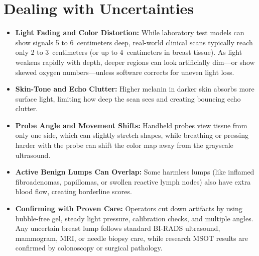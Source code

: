 \section{Dealing with Uncertainties}
\begin{itemize}
  \item \textbf{Light Fading and Color Distortion:} While laboratory test models can show signals 5 to 6~centimeters deep, real-world clinical scans typically reach only 2 to 3~centimeters (or up to 4~centimeters in breast tissue). As light weakens rapidly with depth, deeper regions can look artificially dim---or show skewed oxygen numbers---unless software corrects for uneven light loss.
  \item \textbf{Skin-Tone and Echo Clutter:} Higher melanin in darker skin absorbs more surface light, limiting how deep the scan sees and creating bouncing echo clutter.
  \item \textbf{Probe Angle and Movement Shifts:} Handheld probes view tissue from only one side, which can slightly stretch shapes, while breathing or pressing harder with the probe can shift the color map away from the grayscale ultrasound.
  \item \textbf{Active Benign Lumps Can Overlap:} Some harmless lumps (like inflamed fibroadenomas, papillomas, or swollen reactive lymph nodes) also have extra blood flow, creating borderline scores.
  \item \textbf{Confirming with Proven Care:} Operators cut down artifacts by using bubble-free gel, steady light pressure, calibration checks, and multiple angles. Any uncertain breast lump follows standard BI-RADS ultrasound, mammogram, MRI, or needle biopsy care, while research MSOT results are confirmed by colonoscopy or surgical pathology.
\end{itemize}


